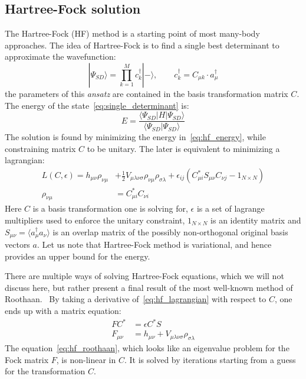 \subsection{Hartree-Fock solution}
The Hartree-Fock (HF) method is a starting point of most many-body approaches.
The idea of Hartree-Fock is to find a single best determinant to 
approximate the wavefunction:
%
\begin{equation}
 |\Psi_{SD} \rangle = \prod_{k=1}^{M} c_k^{\dagger} | -\rangle, \qquad 
c_{k}^{\dagger} = C_{\mu k} \cdot a^{\dagger}_{\mu}
\label{eq:single_determinant}
\end{equation}
% 
the parameters of this \emph{ansatz} are contained in the basis transformation 
matrix $C$. The energy 
of the state~\ref{eq:single_determinant} is:
%
\begin{equation}
 E = \frac{\langle \Psi_{SD} | H | \Psi_{SD} \rangle}{\langle \Psi_{SD} | 
\Psi_{SD} \rangle}
 \label{eq:hf_energy}
\end{equation}
%
The solution is found by minimizing the energy in~\ref{eq:hf_energy}, 
while constraining matrix $C$ to be unitary. The later is equivalent to 
minimizing a lagrangian:
%
\begin{equation}
\begin{aligned}
L(C, \epsilon) = h_{\mu \nu} \rho_{\nu \mu} &+ \frac{1}{2} 
V_{\mu \lambda \nu \sigma} \rho_{\nu \mu } \rho_{\sigma \lambda}  + 
\epsilon_{ij}(C^{\ast}_{\mu i} S_{\mu \nu} C_{\nu j} - 1_{N \times N})\\
\rho_{\nu \mu} &= C^{\ast}_{\mu i} C_{\nu i} 
\label{eq:hf_lagrangian}
\end{aligned}
\end{equation}
%
Here $C$ is a basis transformation one is solving for, $\epsilon$ is a 
set of lagrange multipliers used to enforce the unitary constraint, $1_{N 
\times N}$ is an identity matrix and $S_{\mu \nu} = \langle a^{\dagger}_{\mu} 
a_{\nu} \rangle $ is an overlap matrix of the possibly non-orthogonal original 
basis vectors $a$. Let us note that Hartree-Fock method 
is variational, and hence provides an upper bound for
the energy.\cite{levine2000quantum} 

There are multiple ways of solving Hartree-Fock equations, which we will not 
discuss here, but rather present a final result of the most well-known method 
of Roothaan.~\cite{roothan_carlos} By taking a derivative 
of~\ref{eq:hf_lagrangian} with respect to $C$, one ends up with a matrix 
equation:
%
\begin{equation}
\begin{aligned}
 FC^{\ast} &= \epsilon C^{\ast} S\\
 F_{\mu \nu} &= h_{\mu \nu} + V_{\mu \lambda \nu \sigma} \rho_{\sigma \lambda} 
 \label{eq:hf_roothaan}
\end{aligned}
\end{equation}
%
The equation~\ref{eq:hf_roothaan}, which looks like an eigenvalue problem for 
the Fock matrix $F$, is non-linear in $C$. It is solved by iterations starting 
from a guess for the transformation $C$. 

